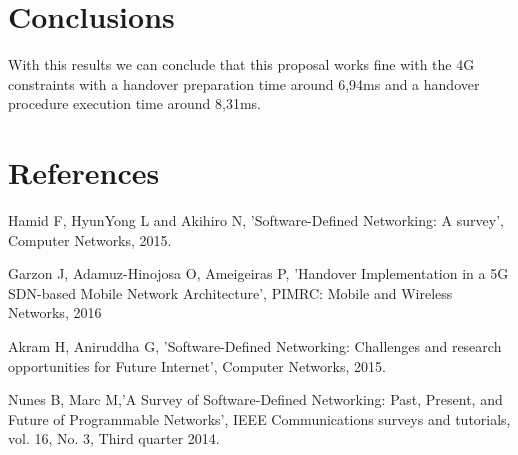 \documentclass[12pt]{article}
\begin{document}
\section{Conclusions}

With this results we can conclude that this proposal works fine with the 4G constraints with a handover preparation time around 6,94ms and a handover procedure execution time around 8,31ms.

\section{References}
      Hamid F, HyunYong L and Akihiro N, ’Software-Defined Networking: A survey’, Computer Networks, 2015.

      Garzon J, Adamuz-Hinojosa O, Ameigeiras P, ’Handover Implementation in a 5G SDN-based Mobile Network Architecture’, PIMRC: Mobile and Wireless Networks, 2016

      Akram H, Aniruddha G, ’Software-Defined Networking: Challenges and research opportunities for Future Internet’, Computer Networks, 2015.

      Nunes B, Marc M,’A Survey of Software-Defined Networking: Past, Present, and Future of Programmable Networks’, IEEE Communications surveys and tutorials, vol. 16, No. 3, Third quarter 2014.
\end{document}
